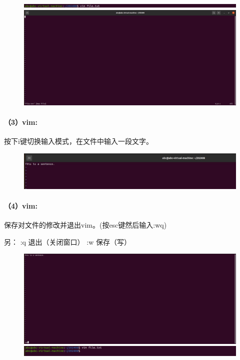 \documentclass[a4paper, 12pt]{article}
\begin{document}
	\begin{figure}[H]
		\centering
		\includegraphics[width=1\textwidth]{018.jpg}
		\includegraphics[width=1\textwidth]{019.jpg}
	\end{figure}
	
	\paragraph{（3）vim:}	
	按下i键切换输入模式，在文件中输入一段文字。
	
	\begin{figure}[H]
		\centering
		\includegraphics[width=1\textwidth]{020.jpg}
	\end{figure}
	
	\paragraph{（4）vim:}
	保存对文件的修改并退出vim。(按esc键然后输入:wq)
	
	另： :q 退出（关闭窗口） 	:w 保存（写）
	
	\begin{figure}[H]
		\centering
		\includegraphics[width=1\textwidth]{021.jpg}
		\includegraphics[width=1\textwidth]{022.jpg}
	\end{figure}
	
\end{document}
